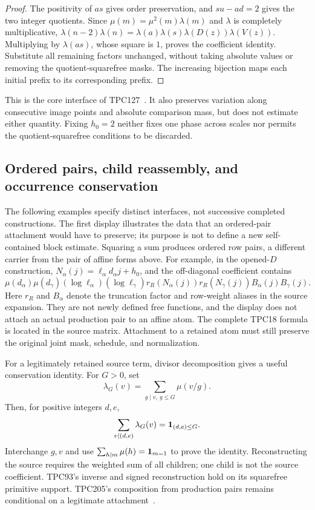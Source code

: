 \begin{proof}
The positivity of $as$ gives order preservation, and $su-ad=2$ gives the two integer quotients. Since $\mu(m)=\mu^2(m)\lambda(m)$ and $\lambda$ is completely multiplicative,
$\lambda(n-2)\lambda(n)=\lambda(a)\lambda(s)\lambda(D(z))\lambda(V(z))$.
Multiplying by $\lambda(as)$, whose square is $1$, proves the coefficient identity. Substitute all remaining factors unchanged, without taking absolute values or removing the quotient-squarefree masks. The increasing bijection maps each initial prefix to its corresponding prefix.
\end{proof}
This is the core interface of TPC127~\cite{archive127}. It also preserves variation along consecutive image points and absolute comparison mass, but does not estimate either quantity. Fixing $h_0=2$ neither fixes one phase across scales nor permits the quotient-squarefree conditions to be discarded.

\subsection{Ordered pairs, child reassembly, and occurrence conservation}
The following examples specify distinct interfaces, not successive completed constructions. The first display illustrates the data that an ordered-pair attachment would have to preserve; its purpose is not to define a new self-contained block estimate.
Squaring a sum produces ordered row pairs, a different carrier from the pair of affine forms above. For example, in the opened-$D$ construction, $N_\alpha(j)=\ell_\alpha d_\alpha j+h_0$, and the off-diagonal coefficient contains
\[
\mu(d_\alpha)\mu(d_\gamma)(\log\ell_\alpha)(\log\ell_\gamma)
r_R(N_\alpha(j))r_R(N_\gamma(j))B_\alpha(j)B_\gamma(j).
\]
Here $r_R$ and $B_\alpha$ denote the truncation factor and row-weight aliases in the source expansion. They are not newly defined free functions, and the display does not attach an actual production pair to an affine atom. The complete TPC18 formula is located in the source matrix. Attachment to a retained atom must still preserve the original joint mask, schedule, and normalization.

For a legitimately retained source term, divisor decomposition gives a useful conservation identity. For $G>0$, set
\[
\lambda_G(v)=\sum_{g\mid v,\ g\le G}\mu(v/g).
\]
Then, for positive integers $d,e$,
\[
\sum_{v\mid(d,e)}\lambda_G(v)=\mathbf 1_{(d,e)\le G}.
\]
Interchange $g,v$ and use $\sum_{h\mid m}\mu(h)=\mathbf 1_{m=1}$ to prove the identity. Reconstructing the source requires the weighted sum of all children; one child is not the source coefficient. TPC93's inverse and signed reconstruction hold on its squarefree primitive support. TPC205's composition from production pairs remains conditional on a legitimate attachment~\cite{archivestructure}.

